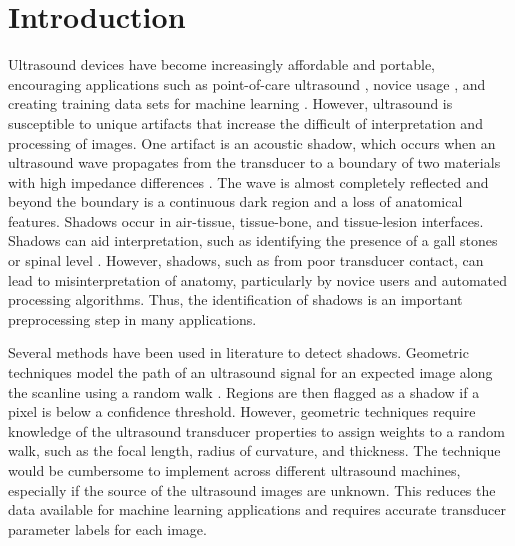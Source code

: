 \documentclass[preprint,5p,authoryear]{elsarticle}
\begin{document}




\section*{Introduction}
\label{intro}
Ultrasound devices have become increasingly affordable and portable, encouraging applications such as point-of-care ultrasound \citep{Bouhemad2011}, novice usage \citep{Becker2016}, and creating training data sets for machine learning \citep{Ghose2013}. However, ultrasound is susceptible to unique artifacts that increase the difficult of interpretation and processing of images. One artifact is an acoustic shadow, which occurs when an ultrasound wave propagates from the transducer to a boundary of two materials with high impedance differences \citep{Kremkau1986}. The wave is almost completely reflected and beyond the boundary is a continuous dark region and a loss of anatomical features. Shadows occur in air-tissue, tissue-bone, and tissue-lesion interfaces. Shadows can aid interpretation, such as identifying the presence of a gall stones \citep{Good1979} or spinal level \citep{Galiano2005}. However, shadows, such as from poor transducer contact, can lead to misinterpretation of anatomy, particularly by novice users and automated processing algorithms. Thus, the identification of shadows is an important preprocessing step in many applications.

Several methods have been used in literature to detect shadows. Geometric techniques model the path of an ultrasound signal for an expected image along the scanline using a random walk \citep{Karamalis2012}. Regions are then flagged as a shadow if a pixel is below a confidence threshold. However, geometric techniques require knowledge of the ultrasound transducer properties to assign weights to a random walk, such as the focal length, radius of curvature, and thickness. The technique would be cumbersome to implement across different ultrasound machines, especially if the source of the ultrasound images are unknown. This reduces the data available for machine learning applications and requires accurate transducer parameter labels for each image.
\end{document}
